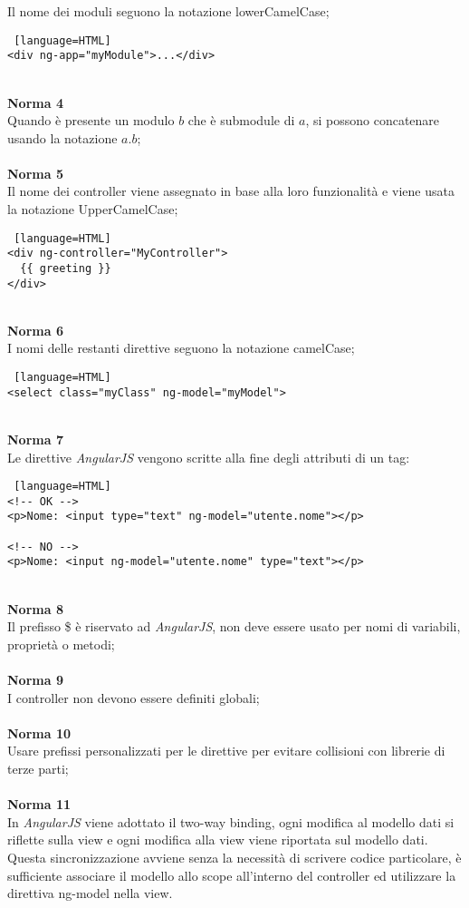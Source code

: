 Il nome dei moduli seguono la notazione lowerCamelCase;
\begin{lstlisting} [language=HTML]
<div ng-app="myModule">...</div>
\end{lstlisting}
\-\\
\textbf{Norma 4}\\
Quando è presente un modulo $b$ che è submodule di $a$, si possono concatenare usando la notazione $a.b$;\\
\-\\
\textbf{Norma 5}\\
Il nome dei controller viene assegnato in base alla loro funzionalità e viene usata la notazione UpperCamelCase;
\begin{lstlisting} [language=HTML]
<div ng-controller="MyController">
  {{ greeting }}
</div>
\end{lstlisting}
\-\\
\textbf{Norma 6}\\
I nomi delle restanti direttive seguono la notazione camelCase;
\begin{lstlisting} [language=HTML]
<select class="myClass" ng-model="myModel">
\end{lstlisting}
\-\\
\textbf{Norma 7}\\
Le direttive \textit{AngularJS} vengono scritte alla fine degli attributi di un tag: 
\begin{lstlisting} [language=HTML]
<!-- OK -->
<p>Nome: <input type="text" ng-model="utente.nome"></p>
	
<!-- NO -->
<p>Nome: <input ng-model="utente.nome" type="text"></p>
\end{lstlisting}
\-\\
\textbf{Norma 8}\\
Il prefisso \$ è riservato ad \textit{AngularJS}, non deve essere usato per nomi di variabili, proprietà o metodi;\\
\-\\
\textbf{Norma 9}\\
I controller non devono essere definiti globali;\\
\-\\
\textbf{Norma 10}\\
Usare prefissi personalizzati per le direttive per evitare collisioni con librerie di terze parti;\\
\-\\
\textbf{Norma 11}\\
In \textit{AngularJS} viene adottato il two-way binding, ogni modifica al modello dati si riflette sulla view e ogni modifica alla view viene riportata sul modello dati.
\-\\
Questa sincronizzazione avviene senza la necessità di scrivere codice particolare, è sufficiente associare il modello allo scope all'interno del controller ed utilizzare la direttiva ng-model nella view.